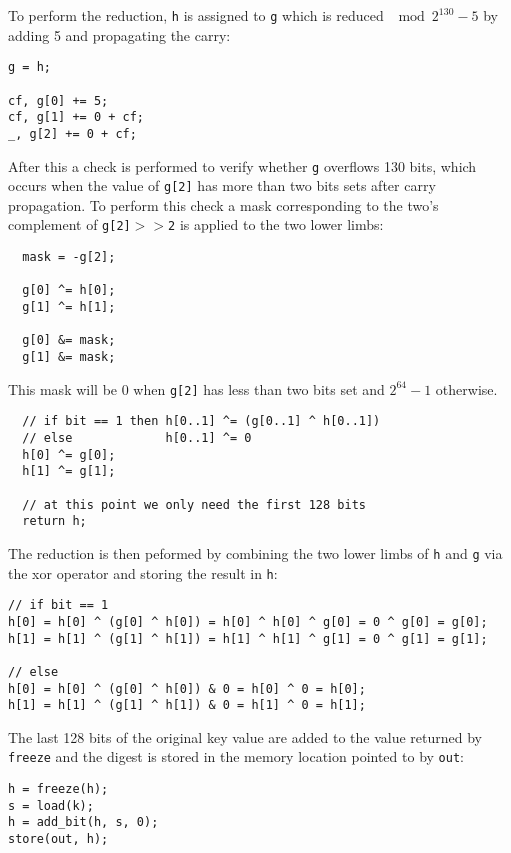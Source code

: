 \documentclass{article}
\begin{document}
To perform the reduction, \texttt{h} is assigned to \texttt{g} which is reduced $\mod 2^{130}-5$ by adding 5 and propagating the carry:
\begin{Verbatim}
g = h;

cf, g[0] += 5;
cf, g[1] += 0 + cf;
_, g[2] += 0 + cf;
\end{Verbatim}
After this a check is performed to verify whether \texttt{g} overflows 130 bits, which occurs when the value of \texttt{g[2]} has more than two bits sets after 
carry propagation. To perform this check a mask corresponding to the two's complement of \texttt{g[2]$>>$2} is applied to the two lower limbs: 
\begin{Verbatim}
  mask = -g[2];

  g[0] ^= h[0];
  g[1] ^= h[1];

  g[0] &= mask;
  g[1] &= mask;
\end{Verbatim}
This mask will be $0$ when \texttt{g[2]} has less than two bits set and $2^{64}-1$ otherwise.
\begin{Verbatim}
  // if bit == 1 then h[0..1] ^= (g[0..1] ^ h[0..1])
  // else             h[0..1] ^= 0
  h[0] ^= g[0];
  h[1] ^= g[1];

  // at this point we only need the first 128 bits
  return h;
\end{Verbatim}
The reduction is then peformed by combining the two lower limbs of \texttt{h} and \texttt{g} via the xor operator and storing the result in \texttt{h}:
\begin{Verbatim}
// if bit == 1
h[0] = h[0] ^ (g[0] ^ h[0]) = h[0] ^ h[0] ^ g[0] = 0 ^ g[0] = g[0];
h[1] = h[1] ^ (g[1] ^ h[1]) = h[1] ^ h[1] ^ g[1] = 0 ^ g[1] = g[1];

// else
h[0] = h[0] ^ (g[0] ^ h[0]) & 0 = h[0] ^ 0 = h[0];
h[1] = h[1] ^ (g[1] ^ h[1]) & 0 = h[1] ^ 0 = h[1];
\end{Verbatim}
The last 128 bits of the original key value are added to the value returned by \texttt{freeze} and the digest is stored in the memory location pointed to by 
\texttt{out}:
\begin{Verbatim}
h = freeze(h);
s = load(k);
h = add_bit(h, s, 0);
store(out, h);
\end{Verbatim}
\end{document}
